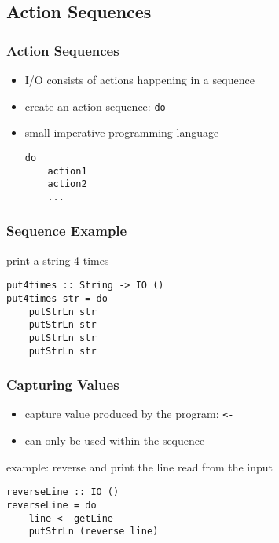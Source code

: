 \documentclass[dvipsnames]{beamer}
\theoremstyle{plain}
\begin{document}
\subsection{Action Sequences}

\begin{frame}[fragile]
  \frametitle{Action Sequences}

  \begin{itemize}
    \item I/O consists of \alert{actions} happening in a sequence
    \item create an action sequence: \lstinline|do|
    \item small imperative programming language

    \medskip
    \begin{lstlisting}
do
    action1
    action2
    ...
    \end{lstlisting}
  \end{itemize}
\end{frame}

\begin{frame}[fragile]
  \frametitle{Sequence Example}

  \begin{exampleblock}{print a string 4 times}
    \begin{lstlisting}
put4times :: String -> IO ()
put4times str = do
    putStrLn str
    putStrLn str
    putStrLn str
    putStrLn str
    \end{lstlisting}
  \end{exampleblock}
\end{frame}

\begin{frame}[fragile]
  \frametitle{Capturing Values}

  \begin{itemize}
    \item capture value produced by the program: \lstinline|<-|
    \item can only be used within the sequence
  \end{itemize}

  \begin{exampleblock}{example: reverse and print the line read from the input}
    \begin{lstlisting}
reverseLine :: IO ()
reverseLine = do
    line <- getLine
    putStrLn (reverse line)
    \end{lstlisting}
  \end{exampleblock}
\end{frame}
\end{document}
